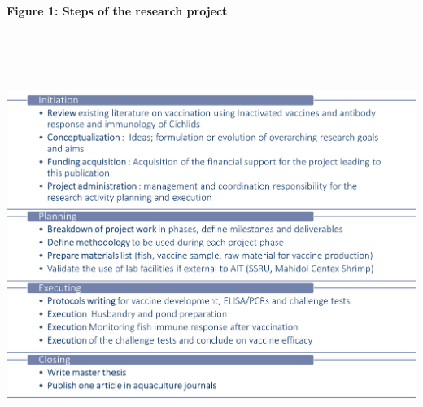 \beginfigure
  \begin{center}
  \begin{flushleft}
  \caption{\textbf{Figure 1: Steps of the research project}} \\
  \end{flushleft}\\
  \\
  \includegraphics[width=\textwidth, height=\textheight, 
                 keepaspectratio]{figures/Figure1.png}
  \label{figure 1: The research plan}
  \endfigure
  \end{center}
\FloatBarrier
